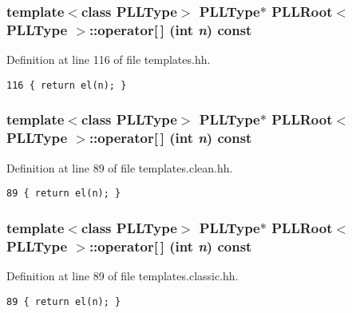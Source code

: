 \subsubsection{\setlength{\rightskip}{0pt plus 5cm}template$<$class PLLType$>$ {\bf PLLType}$\ast$ PLLRoot$<$ {\bf PLLType} $>$::operator[$\,$] (int {\em n}) const\hspace{0.3cm}{\tt  [inline]}}\label{classPLLRoot_a39}




Definition at line 116 of file templates.hh.



\footnotesize\begin{verbatim}116 { return el(n); } 
\end{verbatim}\normalsize 
{}
\subsubsection{\setlength{\rightskip}{0pt plus 5cm}template$<$class PLLType$>$ {\bf PLLType}$\ast$ PLLRoot$<$ {\bf PLLType} $>$::operator[$\,$] (int {\em n}) const\hspace{0.3cm}{\tt  [inline]}}\label{classPLLRoot_a22}




Definition at line 89 of file templates.clean.hh.



\footnotesize\begin{verbatim}89 { return el(n); } 
\end{verbatim}\normalsize 
{}
\subsubsection{\setlength{\rightskip}{0pt plus 5cm}template$<$class PLLType$>$ {\bf PLLType}$\ast$ PLLRoot$<$ {\bf PLLType} $>$::operator[$\,$] (int {\em n}) const\hspace{0.3cm}{\tt  [inline]}}\label{classPLLRoot_a5}




Definition at line 89 of file templates.classic.hh.



\footnotesize\begin{verbatim}89 { return el(n); } 
\end{verbatim}\normalsize 
{}
